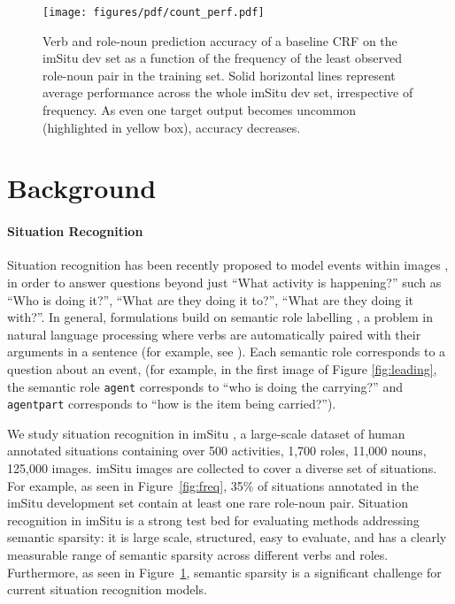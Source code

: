 \documentclass[10pt,twocolumn,letterpaper]{article}
\begin{document}
\begin{figure}[t]
\centering
\texttt{[image: figures/pdf/count\_perf.pdf]}
\caption{\small Verb and role-noun prediction accuracy of a baseline CRF \cite{yatskar2016} on the imSitu dev set as a function of the frequency of the least observed role-noun pair in the training set. Solid horizontal lines represent average performance across the whole imSitu dev set, irrespective of frequency. As even one target output becomes uncommon (highlighted in yellow box), accuracy decreases. }
\label{fig:oov2}
\end{figure}
 \section{Background}
\label{sec:task}
\paragraph{Situation Recognition}
Situation recognition has been recently proposed to model events within images \cite{gupta_vsrl, vsrl2,yang_vsrl,yatskar2016}, in order to answer questions beyond just ``What activity is happening?'' such as ``Who is doing it?'', ``What are they doing it to?'', ``What are they doing it with?''.  
In general, formulations build on semantic role labelling \cite{srl}, a problem in natural language processing where verbs are automatically paired with their arguments in a sentence (for example, see \cite{dasthesis}). 
Each semantic role corresponds to a question about an event, (for example, in the first image of Figure \ref{fig:leading}, the semantic role \texttt{agent} corresponds to ``who is doing the carrying?'' and \texttt{agentpart} corresponds to ``how is the item being carried?''). 

We study situation recognition in imSitu \cite{yatskar2016}, a large-scale dataset of human annotated situations containing over 500 activities, 1,700 roles, 11,000 nouns, 125,000 images. imSitu images are collected to cover a diverse set of situations.
For example, as seen in Figure~\ref{fig:freq}, 35\% of situations annotated in the imSitu development set contain at least one rare role-noun pair. Situation recognition in imSitu is a strong test bed for evaluating methods addressing semantic sparsity: it is large scale, structured, easy to evaluate, and has a clearly measurable range of semantic sparsity across different verbs and roles.
Furthermore, as seen in Figure~\ref{fig:oov2}, semantic sparsity is a significant challenge for current situation recognition models.
\end{document}
